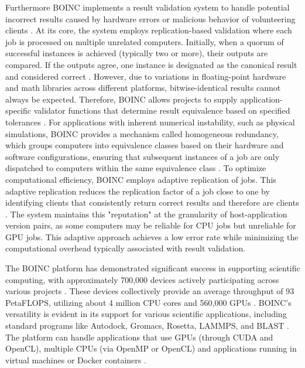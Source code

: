 Furthermore \ac{BOINC} implements a result validation system to handle potential incorrect results caused by hardware errors or malicious behavior of volunteering clients \cite{relatedwork:boinc1}. At its core, the system employs replication-based validation where each job is processed on multiple unrelated computers. Initially, when a quorum of successful instances is achieved (typically two or more), their outputs are compared. If the outputs agree, one instance is designated as the canonical result and considered correct \cite{relatedwork:boinc1}. However, due to variations in floating-point hardware and math libraries across different platforms, bitwise-identical results cannot always be expected. Therefore, \ac{BOINC} allows projects to supply application-specific validator functions that determine result equivalence based on specified tolerances \cite{relatedwork:boinc1}. For applications with inherent numerical instability, such as physical simulations, \ac{BOINC} provides a mechanism called homogeneous redundancy, which groups computers into equivalence classes based on their hardware and software configurations, ensuring that subsequent instances of a job are only dispatched to computers within the same equivalence class \cite{relatedwork:boinc1}. To optimize computational efficiency, \ac{BOINC} employs adaptive replication of jobs. This adaptive replication reduces the replication factor of a job close to one by identifying clients that consistently return correct results and therefore are clients \cite{relatedwork:boinc1}. The system maintains this "reputation" at the granularity of host-application version pairs, as some computers may be reliable for \acs{CPU} jobs but unreliable for \acs{GPU} jobs. This adaptive approach achieves a low error rate while minimizing the computational overhead typically associated with result validation.

The \ac{BOINC} platform has demonstrated significant success in supporting scientific computing, with approximately 700,000 devices actively participating across various projects \cite{relatedwork:boinc1}. These devices collectively provide an average throughput of 93 Peta\ac{FLOPS}, utilizing about 4 million \acs{CPU} cores and 560,000 \acs{GPU}s \cite{relatedwork:boinc1}. \ac{BOINC}'s versatility is evident in its support for various scientific applications, including standard programs like Autodock, Gromacs, Rosetta, LAMMPS, and BLAST \cite{relatedwork:boinc1}. The platform can handle applications that use GPUs (through CUDA and OpenCL), multiple CPUs (via OpenMP or OpenCL) and applications running in virtual machines or Docker containers \cite{relatedwork:boinc1}.

